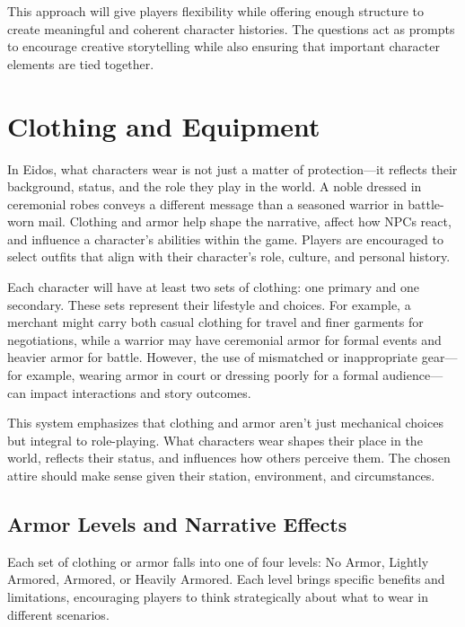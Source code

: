 This approach will give players flexibility while offering enough
structure to create meaningful and coherent character histories. The
questions act as prompts to encourage creative storytelling while also
ensuring that important character elements are tied together.

\hypertarget{clothing-and-equipment}{%
\section{Clothing and Equipment}\label{clothing-and-equipment}}

In Eidos, what characters wear is not just a matter of protection---it
reflects their background, status, and the role they play in the world.
A noble dressed in ceremonial robes conveys a different message than a
seasoned warrior in battle-worn mail. Clothing and armor help shape the
narrative, affect how NPCs react, and influence a character's abilities
within the game. Players are encouraged to select outfits that align
with their character's role, culture, and personal history.

Each character will have at least two sets of clothing: one primary and
one secondary. These sets represent their lifestyle and choices. For
example, a merchant might carry both casual clothing for travel and
finer garments for negotiations, while a warrior may have ceremonial
armor for formal events and heavier armor for battle. However, the use
of mismatched or inappropriate gear---for example, wearing armor in
court or dressing poorly for a formal audience---can impact interactions
and story outcomes.

This system emphasizes that clothing and armor aren't just mechanical
choices but integral to role-playing. What characters wear shapes their
place in the world, reflects their status, and influences how others
perceive them. The chosen attire should make sense given their station,
environment, and circumstances.

\hypertarget{armor-levels-and-narrative-effects}{%
\subsection{Armor Levels and Narrative
Effects}\label{armor-levels-and-narrative-effects}}

Each set of clothing or armor falls into one of four levels: No Armor,
Lightly Armored, Armored, or Heavily Armored. Each level brings specific
benefits and limitations, encouraging players to think strategically
about what to wear in different scenarios.


